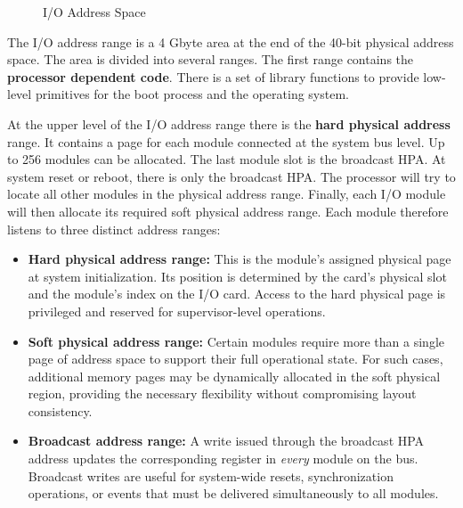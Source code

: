 \begin{figure}[H]
\begin{center}
\end{center}
\caption{I/O Address Space}
\label{fig:I/O Address Space}
\end{figure}

The I/O address range is a 4 Gbyte area at the end of the 40-bit physical address space. The area is divided into several ranges. The first range contains the \textbf{processor dependent code}. There is a set of library functions to provide low-level primitives for the boot process and the operating system. 

At the upper level of the I/O address range there is the \textbf{hard physical address} range. It contains a page for each module connected at the system bus level. Up to 256 modules can be allocated. The last module slot is the broadcast HPA. At system reset or reboot, there is only the broadcast HPA. The processor will try to locate all other modules in the physical address range. Finally, each I/O module will then allocate its required soft physical address range. Each module therefore listens to three distinct address ranges:

\begin{itemize}
    \item \textbf{Hard physical address range:}  
    This is the module’s assigned physical page at system initialization. Its position is determined by the card’s physical slot and the module’s index on the I/O card. Access to the hard physical page is privileged and reserved for supervisor-level operations.

    \item \textbf{Soft physical address range:}  
    Certain modules require more than a single page of address space to support their full operational state. For such cases, additional memory pages may be dynamically allocated in the soft physical region, providing the necessary flexibility without compromising layout consistency.

    \item \textbf{Broadcast address range:}  
    A write issued through the broadcast HPA address updates the corresponding register in \emph{every} module on the bus. Broadcast writes are useful for system-wide resets, synchronization operations, or events that must be delivered simultaneously to all modules.
\end{itemize}

